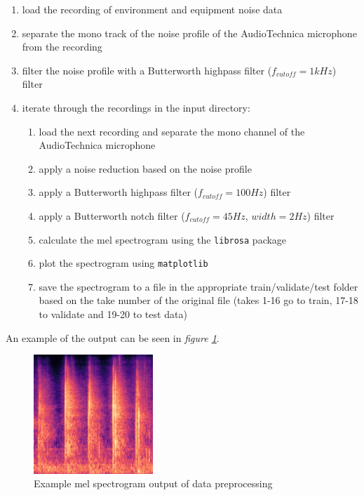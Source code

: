 \documentclass{article}
\begin{document}
\begin{enumerate}
  \item load the recording of environment and equipment noise data
  \item separate the mono track of the noise profile of the AudioTechnica microphone from the recording
  \item filter the noise profile with a Butterworth highpass filter ($f_{cutoff} = 1 kHz$) filter
  \item iterate through the recordings in the input directory:
  \begin{enumerate}
    \item load the next recording and separate the mono channel of the AudioTechnica microphone
    \item apply a noise reduction based on the noise profile
    \item apply a Butterworth highpass filter ($f_{cutoff} = 100 Hz$) filter
    \item apply a Butterworth notch filter ($f_{cutoff} = 45 Hz$, $width = 2 Hz$) filter
    \item calculate the mel spectrogram using the \verb+librosa+ package
    \item plot the spectrogram using \verb+matplotlib+
    \item save the spectrogram to a file in the appropriate train/validate/test folder based on the take number of the original file (takes 1-16 go to train, 17-18 to validate and 19-20 to test data)
  \end{enumerate}
\end{enumerate}

An example of the output can be seen in \textit{figure \ref{fig:mel_spect}}.

\begin{figure}[ht]
  \centering
  \includegraphics[width=0.4\textwidth]{img/hiveMind_slippers_12}
  \caption{Example mel spectrogram output of data preprocessing}
  \label{fig:mel_spect}
\end{figure}
\end{document}
